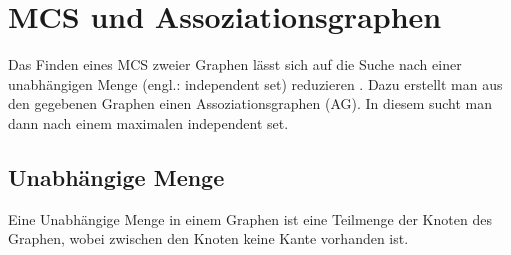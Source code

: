 %
%
%
%

\section{MCS und Assoziationsgraphen}\label{sec:MIS_MCS}
Das Finden eines MCS zweier Graphen lässt sich auf die Suche nach 
einer unabhängigen Menge (engl.: independent set) reduzieren \cite{MaxCSwitMaxIS}. 
Dazu erstellt man aus den gegebenen Graphen einen 
Assoziationsgraphen (AG). In diesem sucht man dann nach einem maximalen 
independent set.

\subsection{Unabhängige Menge}
Eine Unabhängige Menge in einem Graphen ist eine Teilmenge der Knoten des 
Graphen, wobei zwischen den Knoten keine Kante vorhanden ist.

